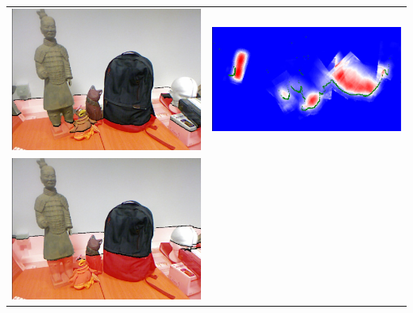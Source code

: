 \documentclass[10pt,onecolumn,letterpaper]{article}
\begin{document}
\begin{tabular}{cc}
\centering
\includegraphics[height=\imheight]{real/statue/rgb_00050.jpg} &
\includegraphics[height=\imheight]{real/statue/slice_00050.jpg} \\
\includegraphics[height=\imheight]{real/statue/rgb_00080.jpg} &

\end{tabular}
\end{document}
